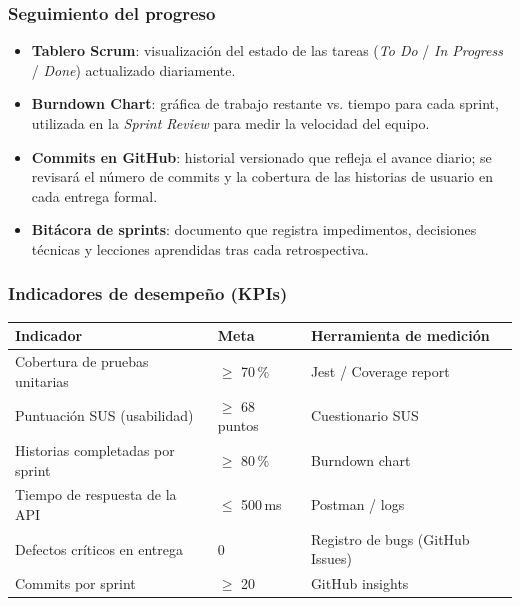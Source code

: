 \subsubsection{Seguimiento del progreso}

\begin{itemize}
  \item \textbf{Tablero Scrum}: visualización del estado de las tareas
    (\textit{To Do} / \textit{In Progress} / \textit{Done}) actualizado
    diariamente.
  \item \textbf{Burndown Chart}: gráfica de trabajo restante vs. tiempo para
    cada sprint, utilizada en la \textit{Sprint Review} para medir la velocidad
    del equipo.
  \item \textbf{Commits en GitHub}: historial versionado que refleja el avance
    diario; se revisará el número de commits y la cobertura de las historias
    de usuario en cada entrega formal.
  \item \textbf{Bitácora de sprints}: documento que registra impedimentos,
    decisiones técnicas y lecciones aprendidas tras cada retrospectiva.
\end{itemize}

\subsubsection{Indicadores de desempeño (KPIs)}

\begin{center}
\begin{tabular}{p{5.5cm} p{3cm} p{4.5cm}}
  \toprule
  \rowcolor{unsaacRed}
  \color{white}\textbf{Indicador} & \color{white}\textbf{Meta} &
  \color{white}\textbf{Herramienta de medición} \\
  \midrule
  Cobertura de pruebas unitarias   & $\geq$ 70\,\%      & Jest / Coverage report \\
  Puntuación SUS (usabilidad)      & $\geq$ 68 puntos   & Cuestionario SUS \\
  Historias completadas por sprint & $\geq$ 80\,\%      & Burndown chart \\
  Tiempo de respuesta de la API    & $\leq$ 500\,ms     & Postman / logs \\
  Defectos críticos en entrega     & 0                  & Registro de bugs (GitHub Issues) \\
  Commits por sprint               & $\geq$ 20          & GitHub insights \\
  \bottomrule
\end{tabular}
\end{center}


